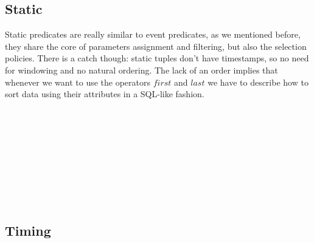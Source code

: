 \subsection{Static}
Static predicates are really similar to event predicates, as we mentioned before, they share the core of parameters assignment and filtering, but also the selection policies. There is a catch though: static tuples don't have timestamps, so no need for windowing and no natural ordering. The lack of an order implies that whenever we want to use the operators $first$ and $last$ we have to describe how to sort data using their attributes in a SQL-like fashion.
\begin{bnf*}
\\
\\
\\
\\
\\
\\
\\
\\
\end{bnf*}

\subsection{Timing}
\begin{bnf*}
\\
\\
\\
\\
\end{bnf*}

